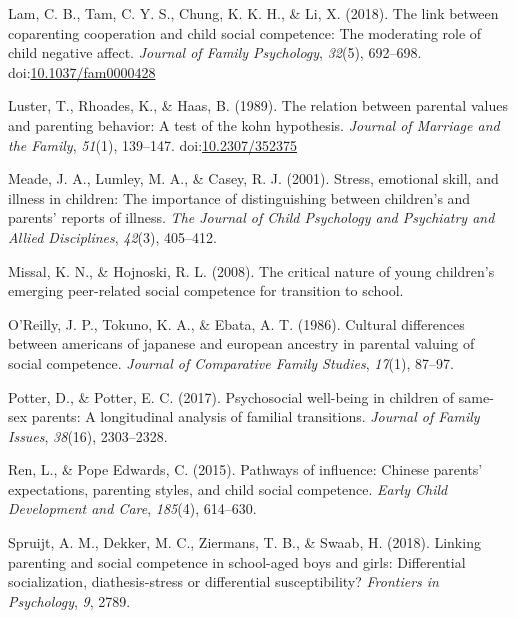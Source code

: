 \documentclass[man]{apa6}
\begin{document}
\leavevmode\hypertarget{ref-Lam_Tam_Chung_Li_2018}{}%
Lam, C. B., Tam, C. Y. S., Chung, K. K. H., \& Li, X. (2018). The link between coparenting cooperation and child social competence: The moderating role of child negative affect. \emph{Journal of Family Psychology}, \emph{32}(5), 692--698. doi:\href{https://doi.org/10.1037/fam0000428}{10.1037/fam0000428}

\leavevmode\hypertarget{ref-Luster_Rhoades_Haas_1989}{}%
Luster, T., Rhoades, K., \& Haas, B. (1989). The relation between parental values and parenting behavior: A test of the kohn hypothesis. \emph{Journal of Marriage and the Family}, \emph{51}(1), 139--147. doi:\href{https://doi.org/10.2307/352375}{10.2307/352375}

\leavevmode\hypertarget{ref-meade2001stress}{}%
Meade, J. A., Lumley, M. A., \& Casey, R. J. (2001). Stress, emotional skill, and illness in children: The importance of distinguishing between children's and parents' reports of illness. \emph{The Journal of Child Psychology and Psychiatry and Allied Disciplines}, \emph{42}(3), 405--412.

\leavevmode\hypertarget{ref-missal2008critical}{}%
Missal, K. N., \& Hojnoski, R. L. (2008). The critical nature of young children's emerging peer-related social competence for transition to school.

\leavevmode\hypertarget{ref-OReilly_Tokuno_Ebata_1986}{}%
O'Reilly, J. P., Tokuno, K. A., \& Ebata, A. T. (1986). Cultural differences between americans of japanese and european ancestry in parental valuing of social competence. \emph{Journal of Comparative Family Studies}, \emph{17}(1), 87--97.

\leavevmode\hypertarget{ref-potter2017psychosocial}{}%
Potter, D., \& Potter, E. C. (2017). Psychosocial well-being in children of same-sex parents: A longitudinal analysis of familial transitions. \emph{Journal of Family Issues}, \emph{38}(16), 2303--2328.

\leavevmode\hypertarget{ref-ren2015pathways}{}%
Ren, L., \& Pope Edwards, C. (2015). Pathways of influence: Chinese parents' expectations, parenting styles, and child social competence. \emph{Early Child Development and Care}, \emph{185}(4), 614--630.

\leavevmode\hypertarget{ref-spruijt2018linking}{}%
Spruijt, A. M., Dekker, M. C., Ziermans, T. B., \& Swaab, H. (2018). Linking parenting and social competence in school-aged boys and girls: Differential socialization, diathesis-stress or differential susceptibility? \emph{Frontiers in Psychology}, \emph{9}, 2789.
\end{document}

